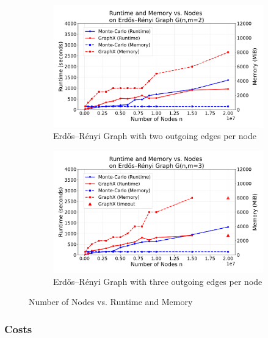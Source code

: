 \begin{figure}[H]
    \centering
    \begin{subfigure}[t]{0.5\linewidth}
        \centering
        \includegraphics[width=\linewidth]{images/plots/ER_2edg/combined_runtime_memory_vs_nodes_2edges_gx_mc.pdf}
        \caption{Erdős–Rényi Graph with two outgoing edges per node}
        \label{fig:wikigibhrs}
    \end{subfigure}
    \begin{subfigure}[t]{0.5\linewidth}
        \centering
        \includegraphics[width=\linewidth]{images/plots/ER_3edg/combined_runtime_memory_vs_nodes_3edges_gx_mc.pdf}
        \caption{Erdős–Rényi Graph with three outgoing edges per node}
        \label{fig:wikigibhrs}
    \end{subfigure}
    \caption{Number of Nodes vs. Runtime and Memory}
    \label{fig:wiki-comparison}
\end{figure}



\subsubsection{Costs}
